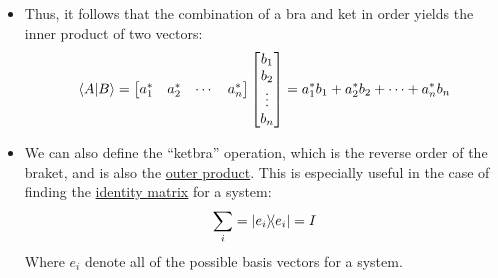 \documentclass{article}
\begin{document}
    \begin{itemize}
        \item Thus, it follows that the combination of a bra and ket in order yields the inner product 
        of two vectors:
        \begin{align*}
            \braket{A}{B} = \begin{bmatrix} a_1^* & a_2^* & \cdots & a_n^* \end{bmatrix} \begin{bmatrix}
                b_1 \\
                b_2 \\
                \vdots \\
                b_n
            \end{bmatrix} = a_1^* b_1 + a_2^* b_2 + \cdots + a_n^* b_n
        \end{align*}
        \item We can also define the ``ketbra'' operation, which is the reverse order of the braket,
        and is also the \underline{outer product}. This is especially useful in the case of finding 
        the \underline{identity matrix} for a system:
        \begin{align*}
            \sum_{i} = \ketbra{e_i}{e_i} = I
        \end{align*}
        Where $e_i$ denote all of the possible basis vectors for a system.


    \end{itemize}
\end{document}
